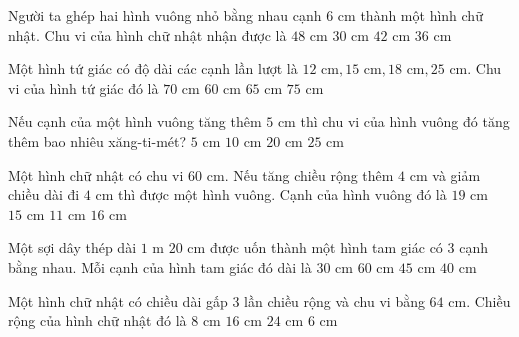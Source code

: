 \begin{ex} %
Người ta ghép hai hình vuông nhỏ bằng nhau cạnh $6\text{ cm}$ thành một hình chữ nhật. Chu vi của hình chữ nhật nhận được là
\choice
{$48\text{ cm}$}
{$30\text{ cm}$}
{$42\text{ cm}$}
{\True $36\text{ cm}$}
\end{ex}

\begin{ex} %
Một hình tứ giác có độ dài các cạnh lần lượt là $12\text{ cm}, 15\text{ cm}, 18\text{ cm}, 25\text{ cm}$. Chu vi của hình tứ giác đó là
\choice
{\True $70\text{ cm}$}
{$60\text{ cm}$}
{$65\text{ cm}$}
{$75\text{ cm}$}
\end{ex}

\begin{ex} %
Nếu cạnh của một hình vuông tăng thêm $5\text{ cm}$ thì chu vi của hình vuông đó tăng thêm bao nhiêu xăng-ti-mét?
\choice
{$5\text{ cm}$}
{$10\text{ cm}$}
{\True $20\text{ cm}$}
{$25\text{ cm}$}
\end{ex}

\begin{ex} %
Một hình chữ nhật có chu vi $60\text{ cm}$. Nếu tăng chiều rộng thêm $4\text{ cm}$ và giảm chiều dài đi $4\text{ cm}$ thì được một hình vuông. Cạnh của hình vuông đó là
\choice
{$19\text{ cm}$}
{\True $15\text{ cm}$}
{$11\text{ cm}$}
{$16\text{ cm}$}
\end{ex}

\begin{ex} %
Một sợi dây thép dài $1\text{ m } 20\text{ cm}$ được uốn thành một hình tam giác có 3 cạnh bằng nhau. Mỗi cạnh của hình tam giác đó dài là
\choice
{$30\text{ cm}$}
{$60\text{ cm}$}
{$45\text{ cm}$}
{\True $40\text{ cm}$}
\end{ex}

\begin{ex} %
Một hình chữ nhật có chiều dài gấp 3 lần chiều rộng và chu vi bằng $64\text{ cm}$. Chiều rộng của hình chữ nhật đó là
\choice
{\True $8\text{ cm}$}
{$16\text{ cm}$}
{$24\text{ cm}$}
{$6\text{ cm}$}
\end{ex}

